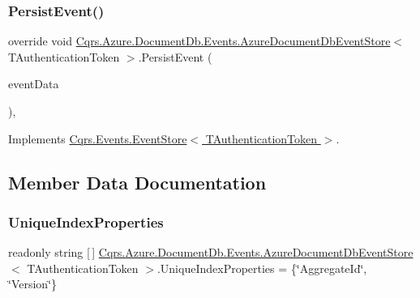 \subsubsection{\texorpdfstring{Persist\+Event()}{PersistEvent()}}
{\footnotesize\ttfamily override void \hyperlink{classCqrs_1_1Azure_1_1DocumentDb_1_1Events_1_1AzureDocumentDbEventStore}{Cqrs.\+Azure.\+Document\+Db.\+Events.\+Azure\+Document\+Db\+Event\+Store}$<$ T\+Authentication\+Token $>$.Persist\+Event (\begin{DoxyParamCaption}\item[{\hyperlink{classCqrs_1_1Events_1_1EventData}{Event\+Data}}]{event\+Data }\end{DoxyParamCaption})\hspace{0.3cm}{\ttfamily [protected]}, {\ttfamily [virtual]}}



Implements \hyperlink{classCqrs_1_1Events_1_1EventStore_aedb71ca0ddf21220e323bc60ad7508cd_aedb71ca0ddf21220e323bc60ad7508cd}{Cqrs.\+Events.\+Event\+Store$<$ T\+Authentication\+Token $>$}.



\subsection{Member Data Documentation}
\mbox{\label{classCqrs_1_1Azure_1_1DocumentDb_1_1Events_1_1AzureDocumentDbEventStore_ab2a2b5dd046487edc33917983587d847_ab2a2b5dd046487edc33917983587d847}} 
\subsubsection{\texorpdfstring{Unique\+Index\+Properties}{UniqueIndexProperties}}
{\footnotesize\ttfamily readonly string \mbox{[}$\,$\mbox{]} \hyperlink{classCqrs_1_1Azure_1_1DocumentDb_1_1Events_1_1AzureDocumentDbEventStore}{Cqrs.\+Azure.\+Document\+Db.\+Events.\+Azure\+Document\+Db\+Event\+Store}$<$ T\+Authentication\+Token $>$.Unique\+Index\+Properties = \{\char`\"{}Aggregate\+Id\char`\"{}, \char`\"{}Version\char`\"{}\}\hspace{0.3cm}{\ttfamily [protected]}}



